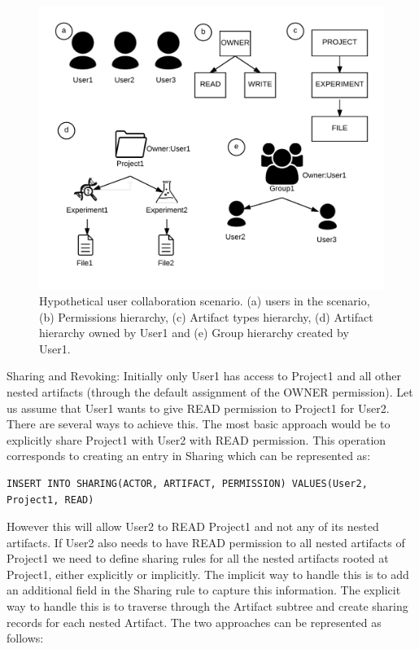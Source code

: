 \documentclass[sigconf]{acmart}
\begin{document}
\begin{figure}
\includegraphics[width=\columnwidth]{figures/usage-scenarios.pdf}
\caption{Hypothetical user collaboration scenario. (a) users in the scenario, (b) Permissions hierarchy, (c) Artifact types hierarchy, (d) Artifact hierarchy owned by User1 and (e) Group hierarchy created by User1.}
\end{figure}

Sharing and Revoking: Initially only User1 has access to Project1 and all other nested artifacts (through the default assignment of the OWNER permission). Let us assume that User1 wants to give READ permission to Project1 for User2.  There are several ways to achieve this. The most basic approach would be to explicitly share Project1 with User2 with READ permission. This operation corresponds to creating an entry in Sharing which can be represented as:

\begin{lstlisting} 
INSERT INTO SHARING(ACTOR, ARTIFACT, PERMISSION) VALUES(User2, Project1, READ)
\end{lstlisting}

However this will allow User2 to READ Project1 and not any of its nested artifacts. If User2 also needs to have READ permission to all nested artifacts of Project1 we need to define sharing rules for all the nested artifacts rooted at Project1, either explicitly or implicitly. The implicit way to handle this is to add an additional field in the Sharing rule to capture this information. The explicit way to handle this is to traverse through the Artifact subtree and create sharing records for each nested Artifact. The two approaches can be represented as follows:
\end{document}
